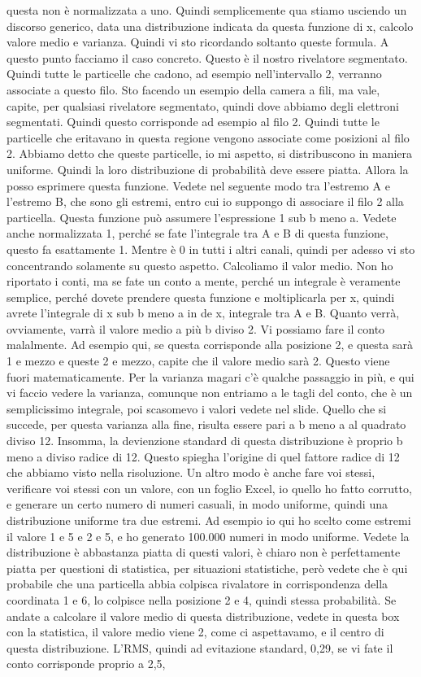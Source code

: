 questa non è normalizzata a uno. Quindi semplicemente qua stiamo usciendo un discorso generico, data una distribuzione indicata da questa funzione di x, calcolo valore medio e varianza. Quindi vi sto ricordando soltanto queste formula. A questo punto facciamo il caso concreto. Questo è il nostro rivelatore segmentato. Quindi tutte le particelle che cadono, ad esempio nell'intervallo 2, verranno associate a questo filo. Sto facendo un esempio della camera a fili, ma vale, capite, per qualsiasi rivelatore segmentato, quindi dove abbiamo degli elettroni segmentati. Quindi questo corrisponde ad esempio al filo 2. Quindi tutte le particelle che eritavano in questa regione vengono associate come posizioni al filo 2. Abbiamo detto che queste particelle, io mi aspetto, si distribuscono in maniera uniforme. Quindi la loro distribuzione di probabilità deve essere piatta. Allora la posso esprimere questa funzione. Vedete nel seguente modo tra l'estremo A e l'estremo B, che sono gli estremi, entro cui io suppongo di associare il filo 2 alla particella. Questa funzione può assumere l'espressione 1 sub b meno a. Vedete anche normalizzata 1, perché se fate l'integrale tra A e B di questa funzione, questo fa esattamente 1. Mentre è 0 in tutti i altri canali, quindi per adesso vi sto concentrando solamente su questo aspetto. Calcoliamo il valor medio. Non ho riportato i conti, ma se fate un conto a mente, perché un integrale è veramente semplice, perché dovete prendere questa funzione e moltiplicarla per x, quindi avrete l'integrale di x sub b meno a in de x, integrale tra A e B. Quanto verrà, ovviamente, varrà il valore medio a più b diviso 2. Vi possiamo fare il conto malalmente. Ad esempio qui, se questa corrisponde alla posizione 2, e questa sarà 1 e mezzo e queste 2 e mezzo, capite che il valore medio sarà 2. Questo viene fuori matematicamente. Per la varianza magari c'è qualche passaggio in più, e qui vi faccio vedere la varianza, comunque non entriamo a le tagli del conto, che è un semplicissimo integrale, poi scasomevo i valori vedete nel slide. Quello che si succede, per questa varianza alla fine, risulta essere pari a b meno a al quadrato diviso 12. Insomma, la devienzione standard di questa distribuzione è proprio b meno a diviso radice di 12. Questo spiegha l'origine di quel fattore radice di 12 che abbiamo visto nella risoluzione. Un altro modo è anche fare voi stessi, verificare voi stessi con un valore, con un foglio Excel, io quello ho fatto corrutto, e generare un certo numero di numeri casuali, in modo uniforme, quindi una distribuzione uniforme tra due estremi. Ad esempio io qui ho scelto come estremi il valore 1 e 5 e 2 e 5, e ho generato 100.000 numeri in modo uniforme. Vedete la distribuzione è abbastanza piatta di questi valori, è chiaro non è perfettamente piatta per questioni di statistica, per situazioni statistiche, però vedete che è qui probabile che una particella abbia colpisca rivalatore in corrispondenza della coordinata 1 e 6, lo colpisce nella posizione 2 e 4, quindi stessa probabilità. Se andate a calcolare il valore medio di questa distribuzione, vedete in questa box con la statistica, il valore medio viene 2, come ci aspettavamo, e il centro di questa distribuzione. L'RMS, quindi ad evitazione standard, 0,29, se vi fate il conto corrisponde proprio a 2,5, 